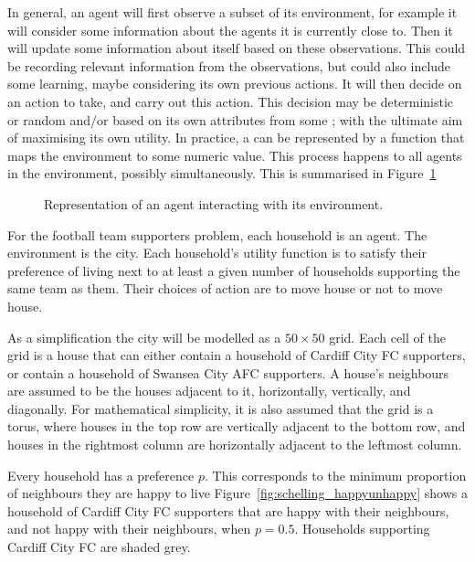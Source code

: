 In general, an agent will first observe a subset of its environment, for
example it will consider some information about the agents it is currently
close to.
Then it will update some information about itself based on these observations.
This could be recording relevant information from the observations, but could
also include some learning, maybe considering its own previous
actions.
It will then decide on an action to take, and carry out this action. This
decision may be deterministic or random and/or based on its own
attributes from some ; with the ultimate aim of
maximising its own utility. In practice, a  can be represented by a
function that maps the environment to some numeric value.
This process happens to all agents in the environment, possibly simultaneously.
This is summarised in Figure~\ref{fig:abm_diagram}

\begin{figure}
    \begin{center}
        
    \end{center}
    \caption{Representation of an agent interacting with its environment.}
    \label{fig:abm_diagram}
\end{figure}

For the football team supporters problem, each household is an agent.
The environment is the city.
Each household's utility function is to satisfy their preference of living next
to at least a given number of households supporting the same team as them.
Their choices of action are to move house or not to move house.

As a simplification the city will be modelled as a \(50 \times 50\) grid.
Each cell of the grid is a house that can either contain a household of Cardiff
City FC supporters, or contain a household of Swansea City AFC supporters.
A house's neighbours are assumed to be the houses adjacent to it, horizontally,
vertically, and diagonally.
For mathematical simplicity, it is also assumed that the grid is a torus,
where
houses in the top row are vertically adjacent to the bottom row, and houses in
the rightmost column are horizontally adjacent to the leftmost column.

Every household has a preference \(p\).
This corresponds to the minimum proportion of neighbours they are happy to live
Figure~\ref{fig:schelling_happyunhappy} shows a household of Cardiff City FC
supporters that are happy with their neighbours, and not happy with their
neighbours, when \(p=0.5\). Households supporting Cardiff City FC are shaded
grey.

